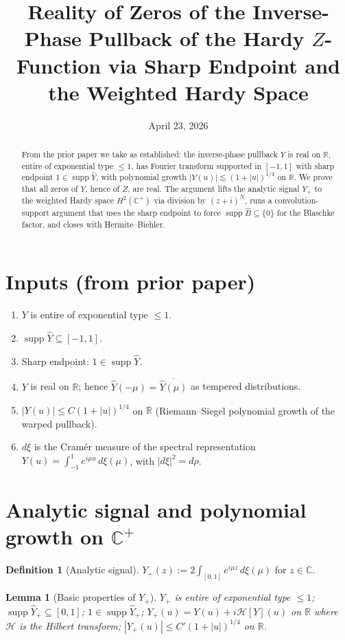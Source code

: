 \documentclass[11pt]{article}
\title{Reality of Zeros of the Inverse-Phase Pullback of the Hardy $Z$-Function via Sharp Endpoint and the Weighted Hardy Space}
\author{}
\date{April 23, 2026}
\newtheorem{lemma}[theorem]{Lemma}
\theoremstyle{definition}
\newtheorem{definition}[theorem]{Definition}
\newcommand{\R}{\mathbb{R}}
\newcommand{\C}{\mathbb{C}}
\newcommand{\Cp}{\C^{+}}
\newcommand{\HH}{\mathcal{H}}
\newcommand{\supp}{\operatorname{supp}}
\begin{document}
\maketitle

\begin{abstract}
From the prior paper we take as established: the inverse-phase pullback $Y$ is real on $\R$, entire of exponential type $\le 1$, has Fourier transform supported in $[-1,1]$ with sharp endpoint $1\in\supp\hat Y$, with polynomial growth $|Y(u)|\lesssim(1+|u|)^{1/4}$ on $\R$. We prove that all zeros of $Y$, hence of $Z$, are real. The argument lifts the analytic signal $Y_+$ to the weighted Hardy space $H^2(\Cp)$ via division by $(z+i)^N$, runs a convolution-support argument that uses the sharp endpoint to force $\supp\hat B\subseteq\{0\}$ for the Blaschke factor, and closes with Hermite--Biehler.
\end{abstract}

\section{Inputs (from prior paper)}

\begin{enumerate}
\item $Y$ is entire of exponential type $\le 1$.
\item $\supp\hat Y\subseteq[-1,1]$.
\item Sharp endpoint: $1\in\supp\hat Y$.
\item $Y$ is real on $\R$; hence $\hat Y(-\mu)=\overline{\hat Y(\mu)}$ as tempered distributions.
\item $|Y(u)|\le C(1+|u|)^{1/4}$ on $\R$ (Riemann--Siegel polynomial growth of the warped pullback).
\item $d\xi$ is the Cramér measure of the spectral representation $Y(u)=\int_{-1}^{1}e^{i\mu u}\,d\xi(\mu)$, with $|d\xi|^2=d\rho$.
\end{enumerate}

\section{Analytic signal and polynomial growth on $\Cp$}

\begin{definition}[Analytic signal]\label{def:Yplus}
$Y_+(z):=2\int_{[0,1]}e^{i\mu z}\,d\xi(\mu)$ for $z\in\C$.
\end{definition}

\begin{lemma}[Basic properties of $Y_+$]\label{lem:basic}
$Y_+$ is entire of exponential type $\le 1$; $\supp\hat Y_+\subseteq[0,1]$; $1\in\supp\hat Y_+$; $Y_+(u)=Y(u)+i\HH[Y](u)$ on $\R$ where $\HH$ is the Hilbert transform; $|Y_+(u)|\le C'(1+|u|)^{1/4}$ on $\R$.
\end{lemma}
\end{document}
